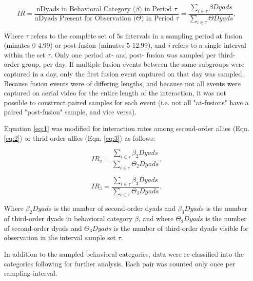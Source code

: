 \documentclass[11pt]{amsart}
\begin{document}
\begin{equation} \label{eq:1}
IR = \frac{\text{nDyads in Behavioral Category ($\beta$) in Period }\tau}{\text{nDyads Present for Observation ($\Theta$) in Period }\tau}  = \frac{\sum\limits_{i \in \tau} \beta{Dyads}}{\sum\limits_{i \in \tau} \Theta{Dyads}},
 \end{equation}

Where $\tau$ refers to the complete set of 5s intervals in a sampling period at fusion (minutes 0-4.99) or post-fusion (minutes 5-12.99), and \emph{i} refers to a single interval within the set $\tau$. Only one period at- and post- fusion was sampled per third-order group, per day. If multiple fusion events between the same subgroups were captured in a day, only the first fusion event captured on that day was sampled. Because fusion events were of differing lengths, and because not all events were captured on aerial video for the entire length of the interaction, it was not possible to construct paired samples for each event (i.e. not all "at-fusions" have a paired "post-fusion" sample, and vice versa).

Equation \ref{eq:1} was modified for interaction rates among second-order allies (Eqn. \ref{eq:2}) or thrid-order allies (Eqn. \ref{eq:3}) as follows: 

\begin{equation} \label{eq:2}
IR_{2} = \frac{\sum\limits_{i \in \tau} \beta_{2}{Dyads}}{\sum\limits_{i \in \tau} \Theta_{2}{Dyads}},
\end{equation}

\begin{equation} \label{eq:3}
IR_{3} = \frac{\sum\limits_{i \in \tau} \beta_{3}{Dyads}}{\sum\limits_{i \in \tau} \Theta_{3}{Dyads}},
\end{equation}

Where $\beta_{2}{Dyads}$ is the number of second-order dyads and $\beta_{3}{Dyads}$ is the number of third-order dyads in behavioral category $\beta$, and where $\Theta_{2}{Dyads}$ is the number of second-order dyads and $\Theta_{3}{Dyads}$ is the number of third-order dyads visible for observation in the interval sample set $\tau$.

In addition to the sampled behavioral categories, data were re-classified into the categories following for further analysis. Each pair was counted only once per sampling interval.
\end{document}
